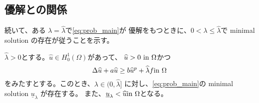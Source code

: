 \subsection{優解との関係}

続いて、ある
$\lambda = \hat{\lambda}$で\ref{eq:prob_main}が
優解をもつときに、$0 < \lambda \leq \hat{\lambda}$で
minimal solution の存在が従うことを示す。

\begin{lem} \label{lem:minimal_itt}
 $\hat{\lambda} > 0$とする。$\hat{u} \in H_0^1(\Omega)$があって、
 $\widehat{u} > 0 ~\text{in}~ \Omega$かつ
 \[
  \Delta \widehat{u} + a\widehat{u} \geq b \widehat{u}^p + \widehat{\lambda}f
 \text{in}~ \Omega
 \]
 をみたすとする。このとき、$\lambda \in (0,\hat{\lambda} ]$
 に対し、\ref{eq:prob_main}の minimal solution $\underline{u}_\lambda$
 が存在する。
 また、$\underline{u}_\lambda < \widehat{u} \text{in}~ \Omega$となる。
\end{lem}

